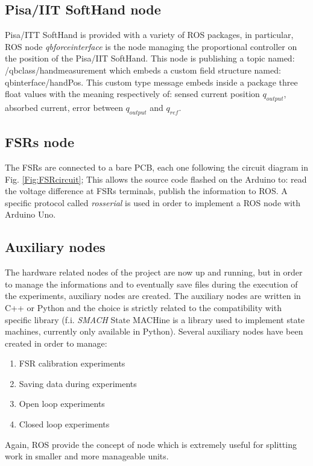 \subsection{Pisa/IIT SoftHand node}
Pisa/ITT SoftHand is provided with a variety of ROS packages, in particular, ROS node \textit{qb\textunderscore force\textunderscore interface} is the node managing the proportional controller on the position of the Pisa/IIT SoftHand. This node is publishing a topic named: /qb\textunderscore class/hand\textunderscore measurement which embeds a custom field structure named: qb\textunderscore interface/handPos. This custom type message embeds inside a package three float values with the meaning respectively of: sensed current position $q_{output}$, absorbed current, error between $q_{output}$ and $q_{ref}$.

\subsection{FSRs node}
The FSRs are connected to a bare PCB, each one following the circuit diagram in Fig. \ref{Fig:FSRcircuit}; This allows the source code flashed on the Arduino to: read the voltage difference at FSRs terminals, publish the information to ROS.
A specific protocol called \textit{rosserial} is used in order to implement a ROS node with Arduino Uno.

\subsection{Auxiliary nodes}
The hardware related nodes of the project are now up and running, but in order to manage the informations and to eventually save files during the execution of the experiments, auxiliary nodes are created.
The auxiliary nodes are written in C++ or Python and the choice is strictly related to the compatibility with specific library (f.i. \textit{SMACH} State MACHine is a library used to implement state machines, currently only available in Python).
Several auxiliary nodes have been created in order to manage:

\begin{enumerate}
\item FSR calibration experiments
\item Saving data during experiments
\item Open loop experiments
\item Closed loop experiments
\end{enumerate}
Again, ROS provide the concept of node which is extremely useful for splitting work in smaller and more manageable units.

